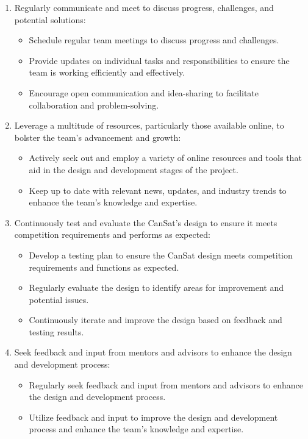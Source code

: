 \begin{enumerate}[topsep=3pt]
    \item Regularly communicate and meet to discuss progress, challenges, and potential solutions:
    \begin{itemize}[leftmargin=0.25cm,itemindent=0.5cm, noitemsep, topsep=2pt, label=\textbullet]
        \item Schedule regular team meetings to discuss progress and challenges.
        \item Provide updates on individual tasks and responsibilities to ensure the team is working efficiently and effectively.
        \item Encourage open communication and idea-sharing to facilitate collaboration and problem-solving.
    \end{itemize}
    \item Leverage a multitude of resources, particularly those available online, to bolster the team's advancement and growth:
    \begin{itemize}[leftmargin=0.25cm,itemindent=0.5cm, noitemsep, topsep=2pt, label=\textbullet]
        \item Actively seek out and employ a variety of online resources and tools that aid in the design and development stages of the project.
        \item Keep up to date with relevant news, updates, and industry trends to enhance the team's knowledge and expertise.
    \end{itemize}
    \item Continuously test and evaluate the CanSat's design to ensure it meets competition requirements and performs as expected:
    \begin{itemize}[leftmargin=0.25cm,itemindent=0.5cm, noitemsep, topsep=2pt, label=\textbullet]
        \item Develop a testing plan to ensure the CanSat design meets competition requirements and functions as expected.
        \item Regularly evaluate the design to identify areas for improvement and potential issues.
        \item Continuously iterate and improve the design based on feedback and testing results.
    \end{itemize}
    \item Seek feedback and input from mentors and advisors to enhance the design and development process:
    \begin{itemize}[leftmargin=0.25cm,itemindent=0.5cm, noitemsep, topsep=2pt, label=\textbullet]
        \item Regularly seek feedback and input from mentors and advisors to enhance the design and development process.
        \item Utilize feedback and input to improve the design and development process and enhance the team's knowledge and expertise.
    \end{itemize}
\end{enumerate}
